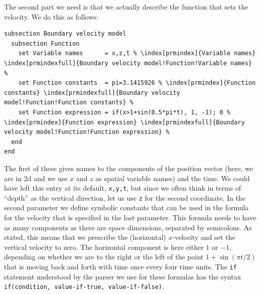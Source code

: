 \documentclass{article}
\begin{document}
The second part we need is that we actually describe the function that sets the
velocity. We do this as follows:
\begin{lstlisting}[frame=single,language=prmfile,escapechar=\%]
subsection Boundary velocity model
  subsection Function
    set Variable names      = x,z,t % \index[prmindex]{Variable names} \index[prmindexfull]{Boundary velocity model!Function!Variable names} %
    set Function constants  = pi=3.1415926 % \index[prmindex]{Function constants} \index[prmindexfull]{Boundary velocity model!Function!Function constants} %
    set Function expression = if(x>1+sin(0.5*pi*t), 1, -1); 0 % \index[prmindex]{Function expression} \index[prmindexfull]{Boundary velocity model!Function!Function expression} %
  end
end
\end{lstlisting}
The first of these gives names to the components of the position vector (here,
we are in 2d and we use $x$ and $z$ as spatial variable names) and the time.
We could have left this entry at its default, \texttt{x,y,t}, but since we
often think in terms of ``depth'' as the vertical direction, let us use
\texttt{z} for the second coordinate.
In the second parameter we define symbolic constants that can be used
in the formula for the velocity that is specified in the last parameter. This
formula needs to have as many components as there are space dimensions,
separated by semicolons. As stated, this means that we prescribe the
(horizontal) $x$-velocity and set the vertical velocity to zero. The horizontal
component is here either $1$ or $-1$, depending on whether we are to the right
or the left of the point $1+\sin(\pi t/2)$ that is moving back and forth with
time once every four time units. The \texttt{if} statement understood by the
parser we use for these formulas has the syntax
\texttt{if(condition, value-if-true, value-if-false)}.
\end{document}
